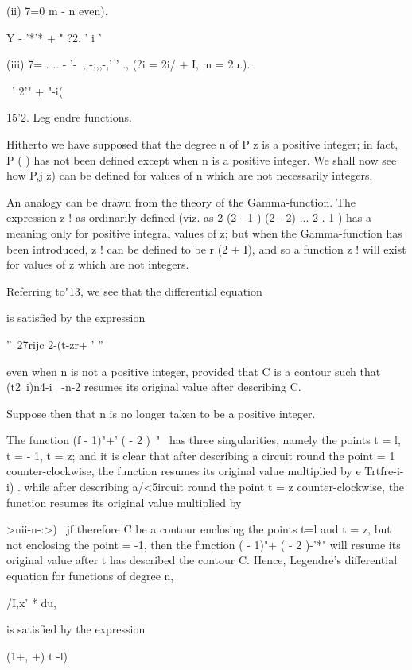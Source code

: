 {(ii) 7=0 m - n even),

Y - '*'* + " ?2. ' i '

(iii) 7= . .. - '-~, -;,,-,' ' ., (?i = 2i/ + I, m = 2u.).

\ ' 2'" + "-i(%

 15'2. Leg endre functions.

Hitherto we have supposed that the degree n of P z is a positive
integer; in fact, P ( ) has not been defined except when n is a
positive integer. We shall now see how P,j z) can be defined for
values of n which are not necessarily integers.

An analogy can be drawn from the theory of the Gamma-function. The
expression z ! as ordinarily defined (viz. as 2 (2 - 1 ) (2 - 2) ... 2
. 1 ) has a meaning only for positive integral values of z; but when
the Gamma-function has been introduced, z ! can be defined to be r (2
+ I), and so a function z ! will exist for values of z which are not
integers.

Referring to"13, we see that the differential equation

is satisfied by the expression

''~27rijc 2-(t-zr+ ' ''

even when n is not a positive integer, provided that C is a contour
such that (t2\ i)n4-i \ -n-2 resumes its original value after
describing C.

Suppose then that n is no longer taken to be a positive integer.

The function (f - 1)"+' ( - 2 )~"~ has three singularities, namely the
points t = l, t = - 1, t = z; and it is clear that after describing a
circuit round the point = 1 counter-clockwise, the function resumes
its original value multiplied by e Trtfre-i-i) . while after
describing a/<5ircuit round the point t = z counter-clockwise, the
function resumes its original value multiplied by

%
%

  >nii-n-:>) \ jf therefore C be a contour enclosing the points t=l
and t = z, but not enclosing the point = -1, then the function ( -
1)"+ ( - 2 )-'*" will resume its original value after t has described
the contour C. Hence, Legendre's differential equation for functions
of degree n,

/I,x' * du,

is satisfied hy the expression

(1+, +) t -l)

}
